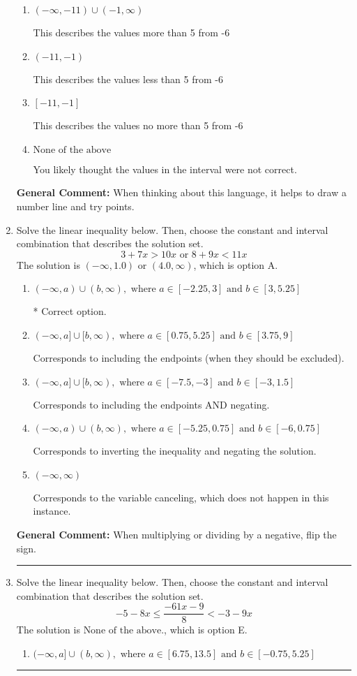 \documentclass{extbook}[14pt]
\newcommand{\litem}[1]{\item #1

\rule{\textwidth}{0.4pt}}
\begin{document}
\begin{enumerate}
{\begin{enumerate}[label=\Alph*.]
This describes the values no less than 5 from -6
\item \( (-\infty, -11) \cup (-1, \infty) \)

This describes the values more than 5 from -6
\item \( (-11, -1) \)

This describes the values less than 5 from -6
\item \( [-11, -1] \)

This describes the values no more than 5 from -6
\item \( \text{None of the above} \)

You likely thought the values in the interval were not correct.
\end{enumerate}

\textbf{General Comment:} When thinking about this language, it helps to draw a number line and try points.
}
\litem{
Solve the linear inequality below. Then, choose the constant and interval combination that describes the solution set.
\[ 3 + 7 x > 10 x \text{ or } 8 + 9 x < 11 x \]The solution is \( (-\infty, 1.0) \text{ or } (4.0, \infty) \), which is option A.\begin{enumerate}[label=\Alph*.]
\item \( (-\infty, a) \cup (b, \infty), \text{ where } a \in [-2.25, 3] \text{ and } b \in [3, 5.25] \)

 * Correct option.
\item \( (-\infty, a] \cup [b, \infty), \text{ where } a \in [0.75, 5.25] \text{ and } b \in [3.75, 9] \)

Corresponds to including the endpoints (when they should be excluded).
\item \( (-\infty, a] \cup [b, \infty), \text{ where } a \in [-7.5, -3] \text{ and } b \in [-3, 1.5] \)

Corresponds to including the endpoints AND negating.
\item \( (-\infty, a) \cup (b, \infty), \text{ where } a \in [-5.25, 0.75] \text{ and } b \in [-6, 0.75] \)

Corresponds to inverting the inequality and negating the solution.
\item \( (-\infty, \infty) \)

Corresponds to the variable canceling, which does not happen in this instance.
\end{enumerate}

\textbf{General Comment:} When multiplying or dividing by a negative, flip the sign.
}
\litem{
Solve the linear inequality below. Then, choose the constant and interval combination that describes the solution set.
\[ -5 - 8 x \leq \frac{-61 x - 9}{8} < -3 - 9 x \]The solution is \( \text{None of the above.} \), which is option E.\begin{enumerate}[label=\Alph*.]
\item \( (-\infty, a] \cup (b, \infty), \text{ where } a \in [6.75, 13.5] \text{ and } b \in [-0.75, 5.25] \)


\end{enumerate}}
\end{enumerate}
\end{document}
